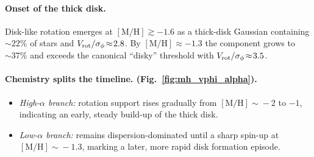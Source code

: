 \documentclass[a4paper,10pt]{article}
\begin{document}
\begin{multicols}{2}
\paragraph{Onset of the thick disk.}
Disk-like rotation emerges at $\mathrm{[M/H]}\gtrsim-1.6$ as a thick-disk
Gaussian containing $\sim22\%$ of stars and
$V_{\rm rot}/\sigma_\phi\!\approx\!2.8$.  By
$\mathrm{[M/H]}\approx-1.3$ the component grows to $\sim37\%$ and exceeds the
canonical “disky” threshold with $V_{\rm rot}/\sigma_\phi\!\approx\!3.5$.



\paragraph{Chemistry splits the timeline. (Fig.~\ref{fig:mh_vphi_alpha}).}
\begin{itemize}
  \item \textit{High-$\alpha$ branch:} rotation support rises gradually from
        $\mathrm{[M/H]}\!\sim\!-2$ to $-1$, indicating an early, steady build-up
        of the thick disk.
  \item \textit{Low-$\alpha$ branch:} remains dispersion-dominated until a
        sharp spin-up at $\mathrm{[M/H]}\!\sim\!-1.3$, marking a later, more
        rapid disk formation episode.
\end{itemize}


\end{multicols}
\end{document}

